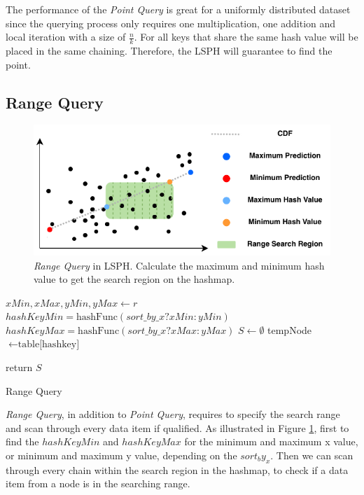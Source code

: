 The performance of the \textit{Point Query} is great for a uniformly distributed dataset since the querying process only requires one multiplication, one addition and local iteration with a size of  $\frac{n}{k}$. For all keys that share the same hash value will be placed in the same chaining. Therefore, the LSPH will guarantee to find the point. 


\subsection{Range Query}

\begin{figure}[ht]
\centering
\includegraphics{Figures/range_search.pdf}
\caption{\textit{Range Query} in LSPH. Calculate the maximum and minimum hash value to get the search region on the hashmap.}
\label{fig:range_search}
\end{figure}


\begin{algorithm}[H] \label{range_query}
\SetAlgoLined
{}
 $xMin, xMax, yMin, yMax\leftarrow{r}$\;
 $hashKeyMin = \text{hashFunc}(sort\_by\_x ? xMin : yMin)$\;
 $hashKeyMax = \text{hashFunc}(sort\_by\_x ? xMax : yMax)$\;
 $S\leftarrow{\emptyset}$\;
 {
 tempNode $\leftarrow{\text{table[hashkey]}}$\;
 }
 
 return $S$\;
 \caption{Range Query}
\end{algorithm}


\textit{Range Query}, in addition to \textit{Point Query}, requires to specify the search range and scan through every data item if qualified. As illustrated in Figure \ref{fig:range_search}, first to find the $hashKeyMin$ and $hashKeyMax$ for the minimum and maximum x value, or minimum and maximum y value, depending on the $sort_by_x$. Then we can scan through every chain within the search region in the hashmap, to check if a data item from a node is in the searching range.

